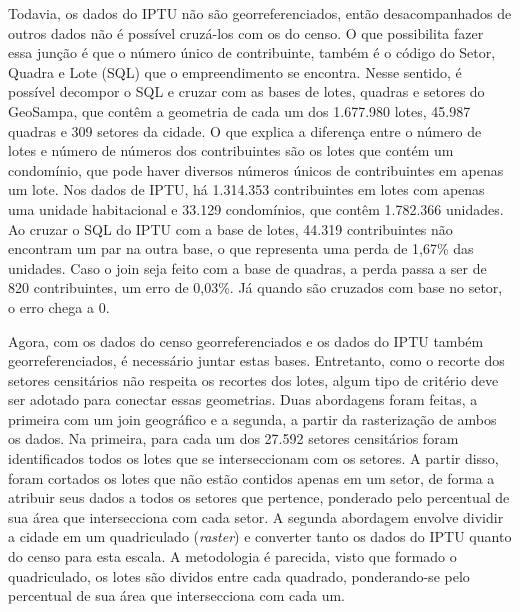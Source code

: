 Todavia, os dados do IPTU não são georreferenciados, então desacompanhados de outros dados não é possível cruzá-los com os do censo. O que possibilita fazer essa junção é que o número único de contribuinte, também é o código do Setor, Quadra e Lote (SQL) que o empreendimento se encontra. Nesse sentido, é possível decompor o SQL e cruzar com as bases de lotes, quadras e setores do GeoSampa, que contêm a geometria de cada  um dos 1.677.980 lotes, 45.987 quadras e 309 setores da cidade. O que explica a diferença entre o número de lotes e número de números dos contribuintes são os lotes que contém um condomínio, que pode haver diversos números únicos de contribuintes em apenas um lote. Nos dados de IPTU, há 1.314.353 contribuintes em lotes com apenas uma unidade habitacional e 33.129 condomínios, que contêm 1.782.366 unidades. Ao cruzar o SQL do IPTU com a base de lotes, 44.319 contribuintes não encontram um par na outra base, o que representa uma perda de 1,67\% das unidades. Caso o join seja feito com a base de quadras, a perda passa a ser de 820 contribuintes, um erro de 0,03\%. Já quando são cruzados com base no setor, o erro chega a 0.

Agora, com os dados do censo georreferenciados e os dados do IPTU também georreferenciados, é necessário juntar estas bases. Entretanto, como o recorte dos setores censitários não respeita os recortes dos lotes, algum tipo de critério deve ser adotado para conectar essas geometrias. Duas abordagens foram feitas, a primeira com um join geográfico e a segunda, a partir da rasterização de ambos os dados. Na primeira, para cada um dos 27.592 setores censitários foram identificados todos os lotes que se interseccionam com os setores. A partir disso, foram cortados os lotes que não estão contidos apenas em um setor, de forma a atribuir seus dados a todos os setores que pertence, ponderado pelo percentual de sua área que intersecciona com cada setor. A segunda abordagem envolve dividir a cidade em um quadriculado (\textit{raster}) e converter tanto os dados do IPTU quanto do censo para esta escala. A metodologia é parecida, visto que formado o quadriculado, os lotes são dividos entre cada quadrado, ponderando-se pelo percentual de sua área que intersecciona com cada um.

